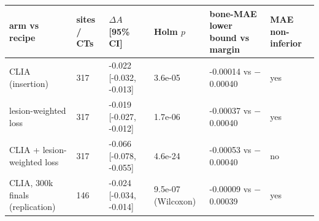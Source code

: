 \begin{tabular}{llllll}
\toprule
arm vs recipe & sites / CTs & $\Delta A$ [95\% CI] & Holm $p$ & bone-MAE lower bound vs margin & MAE non-inferior \\
\midrule
CLIA (insertion) & 317 & -0.022 [-0.032, -0.013] & 3.6e-05 & -0.00014 vs $-$0.00040 & yes \\
lesion-weighted loss & 317 & -0.019 [-0.027, -0.012] & 1.7e-06 & -0.00037 vs $-$0.00040 & yes \\
CLIA + lesion-weighted loss & 317 & -0.066 [-0.078, -0.055] & 4.6e-24 & -0.00053 vs $-$0.00040 & no \\
CLIA, 300k finals (replication) & 146 & -0.024 [-0.034, -0.014] & 9.5e-07 (Wilcoxon) & -0.00009 vs $-$0.00039 & yes \\
\bottomrule
\end{tabular}
